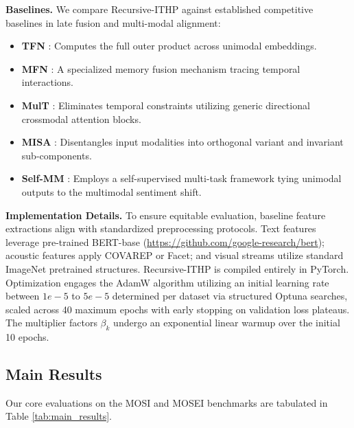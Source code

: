 \documentclass[11pt]{article}
\begin{document}
\textbf{Baselines.} We compare Recursive-ITHP against established competitive baselines in late fusion and multi-modal alignment:
\begin{itemize}
    \item \textbf{TFN} \citep{zadeh2017tensor}: Computes the full outer product across unimodal embeddings.
    \item \textbf{MFN} \citep{zadeh2018memory}: A specialized memory fusion mechanism tracing temporal interactions.
    \item \textbf{MulT} \citep{tsai2019multimodal}: Eliminates temporal constraints utilizing generic directional crossmodal attention blocks.
    \item \textbf{MISA} \citep{hazarika2020misa}: Disentangles input modalities into orthogonal variant and invariant sub-components.
    \item \textbf{Self-MM} \citep{yu2021learning}: Employs a self-supervised multi-task framework tying unimodal outputs to the multimodal sentiment shift.
\end{itemize}

\textbf{Implementation Details.} To ensure equitable evaluation, baseline feature extractions align with standardized preprocessing protocols. Text features leverage pre-trained BERT-base (\url{https://github.com/google-research/bert}); acoustic features apply COVAREP or Facet; and visual streams utilize standard ImageNet pretrained structures. Recursive-ITHP is compiled entirely in PyTorch. Optimization engages the AdamW algorithm utilizing an initial learning rate between $1e-5$ to $5e-5$ determined per dataset via structured Optuna searches, scaled across 40 maximum epochs with early stopping on validation loss plateaus. The multiplier factors $\beta_k$ undergo an exponential linear warmup over the initial 10 epochs.

\subsection{Main Results}
Our core evaluations on the MOSI and MOSEI benchmarks are tabulated in Table \ref{tab:main_results}.
\end{document}
